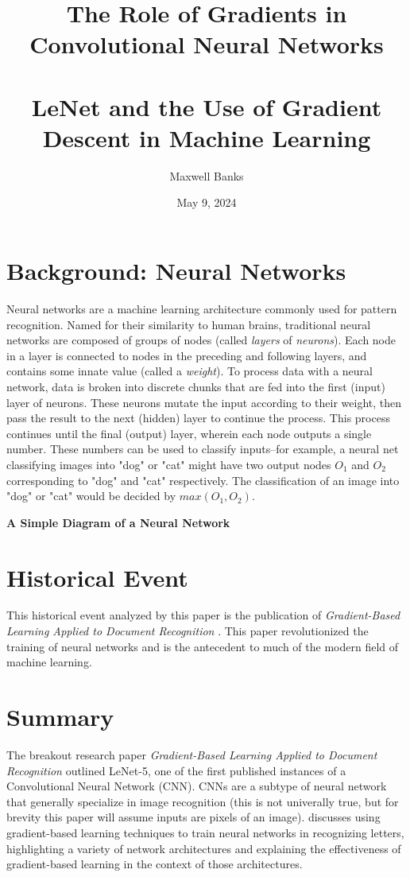 \documentclass[11pt, a4paper]{article}
\title{
    The Role of Gradients in Convolutional Neural Networks\\~\\
    \large LeNet and the Use of Gradient Descent in Machine Learning}
\author{
    Maxwell Banks
}
\date{May 9, 2024}
\begin{document}
\nocite{*}
\maketitle
\newpage
\section{Background: Neural Networks}
Neural networks are a machine learning architecture commonly used for pattern recognition. Named for their 
similarity to human brains, traditional neural networks are composed of groups of nodes (called 
\textit{layers} of \textit{neurons}). Each node in a layer is connected to nodes in the preceding and following
layers, and contains some innate value (called a \textit{weight}). To process data with a neural network, data
is broken into discrete chunks that are fed into the first (input) layer of neurons. These neurons mutate the 
input according to their weight, then pass the result to the next (hidden) layer to continue the process. This 
process continues until the final (output) layer, wherein each node outputs a single number. These numbers can 
be used to classify inputs--for example, a neural net classifying images into "dog" or "cat" might have two
output nodes $O_1$ and $O_2$ corresponding to "dog" and "cat" respectively. The classification of an image into
"dog" or "cat" would be decided by $max(O_1, O_2)$. \\
\begin{center}
    \textbf{A Simple Diagram of a Neural Network}\\
    
\end{center}

\section{Historical Event}
This historical event analyzed by this paper is the publication of \textit{Gradient-Based Learning Applied to Document Recognition} \cite{lecun}.
This paper revolutionized the training of neural networks and is the antecedent to much of the modern field of 
machine learning. 

\section{Summary}
The breakout research paper \textit{Gradient-Based Learning Applied to Document Recognition} \cite{lecun}
outlined LeNet-5, one of the first published instances of a Convolutional Neural Network (CNN). CNNs are a subtype
of neural network that generally specialize in image recognition (this is not univerally true, but for brevity this
paper will assume inputs are pixels of an image). \cite{lecun} discusses using gradient-based learning 
techniques to train neural networks in recognizing letters, highlighting a variety of network architectures 
and explaining the effectiveness of gradient-based learning in the context of those architectures. \\
\end{document}
